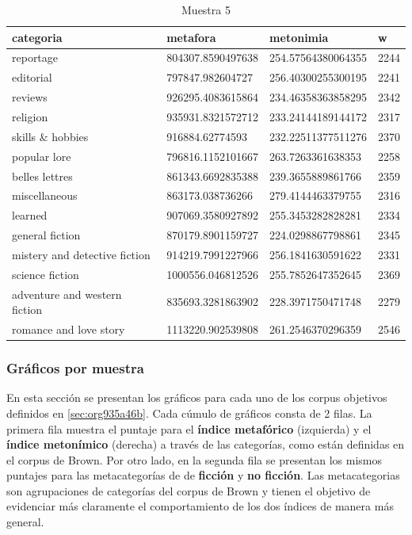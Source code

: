 \documentclass[12pt,letterpaper,twoside]{article}
\begin{document}
\begin{center}
\begin{longtable}{| p{} | p{} | p{}|p{}|}
\caption{Muestra 5}
    \hline
        categoria & metafora & metonimia & w \\ \hline
        reportage & 804307.8590497638 & 254.57564380064355 & 2244 \\ \hline
        editorial & 797847.982604727 & 256.40300255300195 & 2241 \\ \hline
        reviews & 926295.4083615864 & 234.46358363858295 & 2342 \\ \hline
        religion & 935931.8321572712 & 233.24144189144172 & 2317 \\ \hline
        skills \& hobbies & 916884.62774593 & 232.22511377511276 & 2370 \\ \hline
        popular lore & 796816.1152101667 & 263.7263361638353 & 2258 \\ \hline
        belles lettres & 861343.6692835388 & 239.3655889861766 & 2359 \\ \hline
        miscellaneous & 863173.038736266 & 279.4144463379755 & 2316 \\ \hline
        learned & 907069.3580927892 & 255.3453282828281 & 2334 \\ \hline
        general fiction & 870179.8901159727 & 224.0298867798861 & 2345 \\ \hline
        mistery and detective fiction & 914219.7991227966 & 256.1841630591622 & 2331 \\ \hline
        science fiction & 1000556.046812526 & 255.7852647352645 & 2369 \\ \hline
        adventure and western fiction & 835693.3281863902 & 228.3971750471748 & 2279 \\ \hline
        romance and love story & 1113220.902539808 & 261.2546370296359 & 2546 \\ \hline
\end{longtable}
    \label{muestra5}
\end{center}
\subsubsection{Gráficos por muestra}
\label{sec:org328c82b}
En esta sección se presentan los gráficos para cada uno de los corpus objetivos
definidos en \ref{sec:org935a46b}. Cada cúmulo de gráficos consta de 2 filas.
La primera fila muestra el puntaje para el \textbf{índice metafórico} (izquierda) y
el \textbf{índice metonímico} (derecha) a través de las categorías, como están
definidas en el corpus de Brown. Por otro lado, en la segunda fila
se presentan los mismos puntajes para las metacategorías de de \textbf{ficción}
y \textbf{no ficción}. Las metacategorias son agrupaciones de categorías del corpus
de Brown y tienen el objetivo de evidenciar más claramente el comportamiento
de los dos índices de manera más general.
\end{document}
